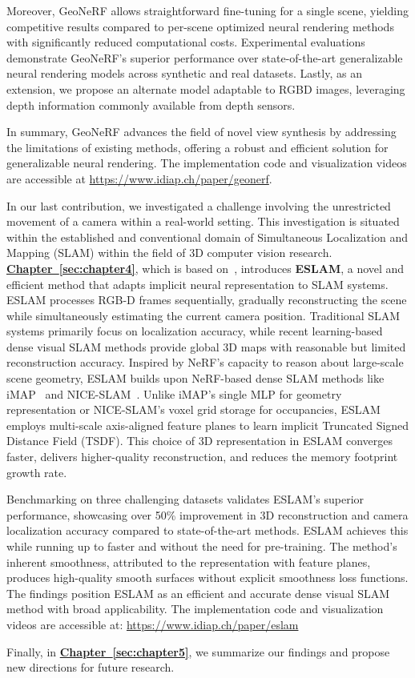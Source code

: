 Moreover, GeoNeRF allows straightforward fine-tuning for a single scene, yielding competitive results compared to per-scene optimized neural rendering methods with significantly reduced computational costs. Experimental evaluations demonstrate GeoNeRF's superior performance over state-of-the-art generalizable neural rendering models across synthetic and real datasets. Lastly, as an extension, we propose an alternate model adaptable to RGBD images, leveraging depth information commonly available from depth sensors.

In summary, GeoNeRF advances the field of novel view synthesis by addressing the limitations of existing methods, offering a robust and efficient solution for generalizable neural rendering. The implementation code and visualization videos are accessible at \href{https://www.idiap.ch/paper/geonerf}{https://www.idiap.ch/paper/geonerf}.

In our last contribution, we investigated a challenge involving the unrestricted movement of a camera within a real-world setting. This investigation is situated within the established and conventional domain of Simultaneous Localization and Mapping (SLAM) within the field of 3D computer vision research. \textbf{\hyperref[sec:chapter4]{Chapter~\ref{sec:chapter4}}}, which is based on~\cite{johari2023eslam}, introduces \textbf{ESLAM}, a novel and efficient method that adapts implicit neural representation to SLAM systems. ESLAM processes RGB-D frames sequentially, gradually reconstructing the scene while simultaneously estimating the current camera position. Traditional SLAM systems primarily focus on localization accuracy, while recent learning-based dense visual SLAM methods provide global 3D maps with reasonable but limited reconstruction accuracy. Inspired by NeRF's capacity to reason about large-scale scene geometry, ESLAM builds upon NeRF-based dense SLAM methods like iMAP~\citep{sucar2021imap} and NICE-SLAM~\citep{zhu2022nice}. Unlike iMAP's single MLP for geometry representation or NICE-SLAM's voxel grid storage for occupancies, ESLAM employs multi-scale axis-aligned feature planes to learn implicit Truncated Signed Distance Field (TSDF). This choice of 3D representation in ESLAM converges faster, delivers higher-quality reconstruction, and reduces the memory footprint growth rate.

Benchmarking on three challenging datasets validates ESLAM's superior performance, showcasing over 50\% improvement in 3D reconstruction and camera localization accuracy compared to state-of-the-art methods. ESLAM achieves this while running up to  faster and without the need for pre-training. The method's inherent smoothness, attributed to the representation with feature planes, produces high-quality smooth surfaces without explicit smoothness loss functions. The findings position ESLAM as an efficient and accurate dense visual SLAM method with broad applicability. The implementation code and visualization videos are accessible at: \href{https://www.idiap.ch/paper/eslam}{https://www.idiap.ch/paper/eslam}

Finally, in \textbf{\hyperref[sec:chapter5]{Chapter~\ref{sec:chapter5}}}, we summarize our findings and propose new directions for future research.